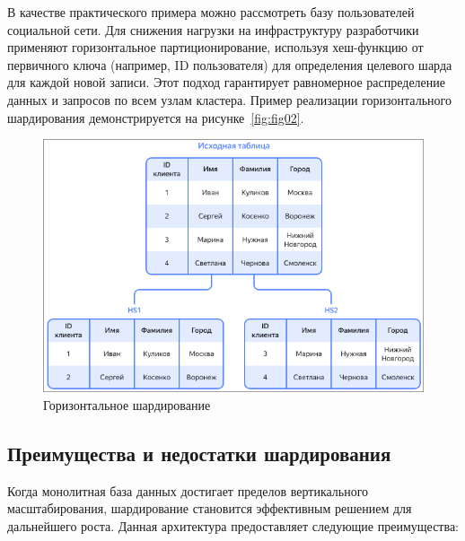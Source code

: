 \begin{itemize}
    В качестве практического примера можно рассмотреть базу пользователей
    социальной сети. Для снижения нагрузки на инфраструктуру разработчики
    применяют горизонтальное партиционирование, используя хеш-функцию от
    первичного ключа (например, ID пользователя) для определения целевого шарда
    для каждой новой записи. Этот подход гарантирует равномерное распределение
    данных и запросов по всем узлам кластера. Пример реализации горизонтального
    шардирования демонстрируется на рисунке~\ref{fig:fig02}.

\begin{figure}
  \centering
  \includegraphics[scale=0.35]{inc/horizontal-sharding.png}
  \caption{Горизонтальное шардирование}
  \label{fig:fig01}
\end{figure}
\end{itemize}

\subsection{Преимущества и недостатки шардирования}

Когда монолитная база данных достигает пределов вертикального масштабирования,
шардирование становится эффективным решением для дальнейшего роста. Данная
архитектура предоставляет следующие преимущества:

